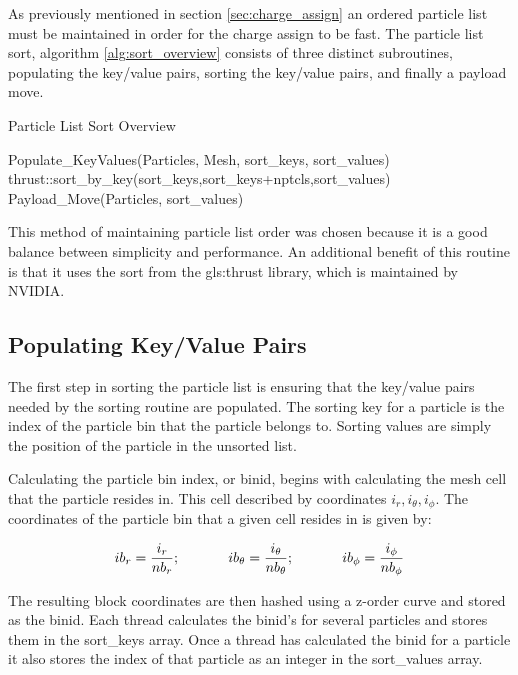 	As previously mentioned in section \ref{sec:charge_assign} an ordered particle list must be maintained in order for the charge assign to be fast. The particle list sort, algorithm \ref{alg:sort_overview} consists of three distinct subroutines, populating the key/value pairs, sorting the key/value pairs, and finally a payload move. 

\begin{algorithm}
	\caption{Particle List Sort Overview}
	\label{alg:sort_overview}
	\begin{algorithmic}
		\STATE
		\STATE Populate\_KeyValues(Particles, Mesh, sort\_keys, sort\_values)
		\STATE
		\STATE thrust::sort\_by\_key(sort\_keys,sort\_keys+nptcls,sort\_values)
		\STATE
		\STATE Payload\_Move(Particles, sort\_values)
	\end{algorithmic}
\end{algorithm}

This method of maintaining particle list order was chosen because it is a good balance between simplicity and performance. An additional benefit of this routine is that it uses the sort from the \gls{gls:thrust} library, which is maintained by NVIDIA. 

		\subsection{Populating Key/Value Pairs}
The first step in sorting the particle list is ensuring that the key/value pairs needed by the sorting routine are populated. The sorting key for a particle is the index of the particle bin that the particle belongs to. Sorting values are simply the position of the particle in the unsorted list. 

Calculating the particle bin index, or binid, begins with calculating the mesh cell that the particle resides in. This cell described by coordinates $i_r, i_{\theta}, i_{\phi}$. The coordinates of the particle bin that a given cell resides in is given by:

\begin{equation}
ib_r = \frac{i_r}{nb_r} \mathrm{;}\hspace{0.5in} ib_{\theta} = \frac{i_{\theta}}{nb_{\theta}} \mathrm{;} \hspace{0.5in} ib_{\phi} = \frac{i_{\phi}}{nb_{\phi}}
\end{equation}

	The resulting block coordinates are then hashed using a z-order curve and stored as the binid. Each thread calculates the binid's for several particles and stores them in the sort\_keys array. Once a thread has calculated the binid for a particle it also stores the index of that particle as an integer in the sort\_values array. 


